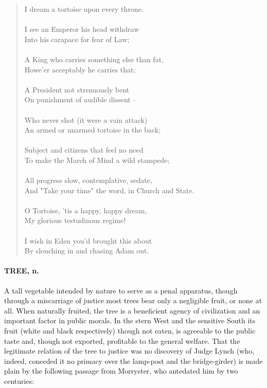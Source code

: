 \documentclass[11pt]{article}
\begin{document}
\begin{quote}
  I dream a tortoise upon every throne. \\
 \\
  I see an Emperor his head withdraw \\
  Into his carapace for fear of Law; \\
 \\
  A King who carries something else than fat, \\
  Howe'er acceptably he carries that; \\
 \\
  A President not strenuously bent \\
  On punishment of audible dissent -- \\
 \\
  Who never shot (it were a vain attack) \\
  An armed or unarmed tortoise in the back; \\
 \\
  Subject and citizens that feel no need \\
  To make the March of Mind a wild stampede; \\
 \\
  All progress slow, contemplative, sedate, \\
  And "Take your time" the word, in Church and State. \\
 \\
  O Tortoise, 'tis a happy, happy dream, \\
  My glorious testudinous regime! \\
 \\
  I wish in Eden you'd brought this about \\
  By slouching in and chasing Adam out.  \end{quote}

\paragraph{TREE, n.}  A tall vegetable intended by nature to serve as a penal
apparatus, though through a miscarriage of justice most trees bear
only a negligible fruit, or none at all.  When naturally fruited, the
tree is a beneficient agency of civilization and an important factor
in public morals.  In the stern West and the sensitive South its fruit
(white and black respectively) though not eaten, is agreeable to the
public taste and, though not exported, profitable to the general
welfare.  That the legitimate relation of the tree to justice was no
discovery of Judge Lynch (who, indeed, conceded it no primacy over the
lamp-post and the bridge-girder) is made plain by the following
passage from Morryster, who antedated him by two centuries:
\end{document}
